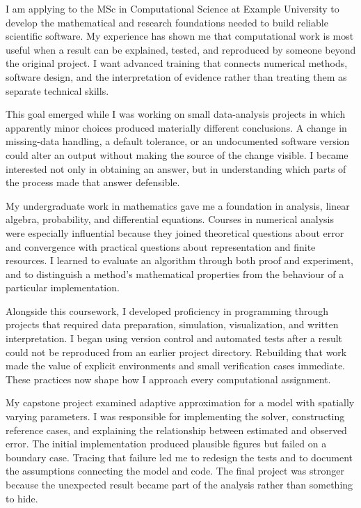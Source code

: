 \documentclass[type=purpose]{careerdossier-statement}
\begin{document}
\MakeCDossierStatementHeader


I am applying to the MSc in Computational Science at Example University to
develop the mathematical and research foundations needed to build reliable
scientific software. My experience has shown me that computational work is most
useful when a result can be explained, tested, and reproduced by someone beyond
the original project. I want advanced training that connects numerical methods,
software design, and the interpretation of evidence rather than treating them
as separate technical skills.

This goal emerged while I was working on small data-analysis projects in which
apparently minor choices produced materially different conclusions. A change in
missing-data handling, a default tolerance, or an undocumented software version
could alter an output without making the source of the change visible. I became
interested not only in obtaining an answer, but in understanding which parts of
the process made that answer defensible.


My undergraduate work in mathematics gave me a foundation in analysis, linear
algebra, probability, and differential equations. Courses in numerical analysis
were especially influential because they joined theoretical questions about
error and convergence with practical questions about representation and finite
resources. I learned to evaluate an algorithm through both proof and experiment,
and to distinguish a method's mathematical properties from the behaviour of a
particular implementation.

Alongside this coursework, I developed proficiency in programming through
projects that required data preparation, simulation, visualization, and written
interpretation. I began using version control and automated tests after a result
could not be reproduced from an earlier project directory. Rebuilding that work
made the value of explicit environments and small verification cases immediate.
These practices now shape how I approach every computational assignment.

My capstone project examined adaptive approximation for a model with spatially
varying parameters. I was responsible for implementing the solver, constructing
reference cases, and explaining the relationship between estimated and observed
error. The initial implementation produced plausible figures but failed on a
boundary case. Tracing that failure led me to redesign the tests and to document
the assumptions connecting the model and code. The final project was stronger
because the unexpected result became part of the analysis rather than something
to hide.
\end{document}
